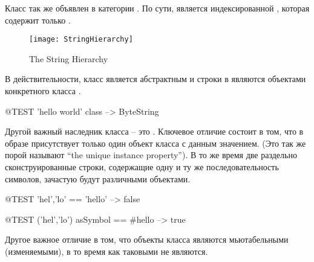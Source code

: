 \documentclass[a4paper,10pt,twoside]{book}
\begin{document}
Класс  так же объявлен в категории . По сути,  является индексированной , которая содержит только .

\begin{figure}[ht]
	{\centerline {\texttt{[image: StringHierarchy]}}}
\caption{The String Hierarchy }
\end{figure}

В действительности, класс  является абстрактным и строки в \pharo являются объектами конкретного класса .

\begin{code}{@TEST}
'hello world' class --> ByteString
\end{code}

Другой важный наследник класса  -- это .  Ключевое отличие состоит в том, что в образе присутствует только один объект класса   с данным значением.  (Это так же порой называют ``the unique instance property'').  В то же время две раздельно сконструированные строки, содержащие одну и ту же последовательность символов, зачастую будут различными объектами.


\begin{code}{@TEST}
'hel','lo' == 'hello' --> false
\end{code}

\begin{code}{@TEST}
('hel','lo') asSymbol == #hello --> true
\end{code}

\noindent
Другое важное отличие в том, что объекты класса  являются мьютабельными (изменяемыми), в то время как  таковыми не являются.
\end{document}

